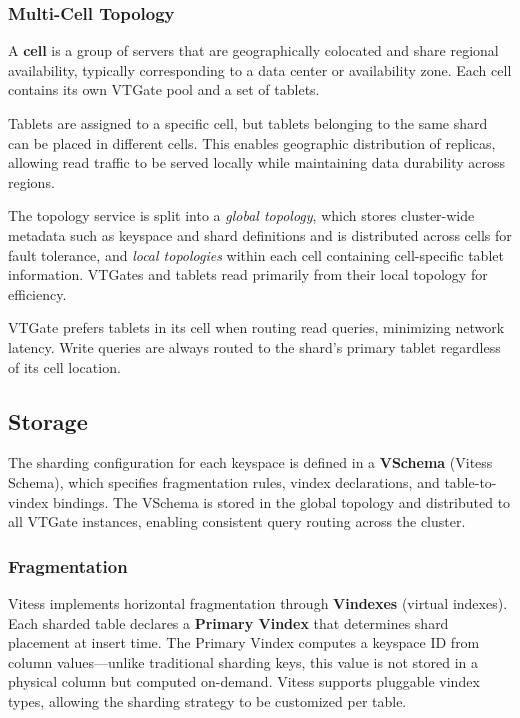 \documentclass{article}
\begin{document}
\subsubsection{Multi-Cell Topology}

A \textbf{cell} is a group of servers that are geographically colocated and share regional availability, typically corresponding to a data center or availability zone. Each cell contains its own VTGate pool and a set of tablets.

Tablets are assigned to a specific cell, but tablets belonging to the same shard can be placed in different cells. This enables geographic distribution of replicas, allowing read traffic to be served locally while maintaining data durability across regions.

The topology service is split into a \emph{global topology}, which stores cluster-wide metadata such as keyspace and shard definitions and is distributed across cells for fault tolerance, and \emph{local topologies} within each cell containing cell-specific tablet information. VTGates and tablets read primarily from their local topology for efficiency.

VTGate prefers tablets in its cell when routing read queries, minimizing network latency. Write queries are always routed to the shard's primary tablet regardless of its cell location.

\subsection{Storage}

The sharding configuration for each keyspace is defined in a \textbf{VSchema} (Vitess Schema), which specifies fragmentation rules, vindex declarations, and table-to-vindex bindings. The VSchema is stored in the global topology and distributed to all VTGate instances, enabling consistent query routing across the cluster.

\subsubsection{Fragmentation}

Vitess implements horizontal fragmentation through \textbf{Vindexes} (virtual indexes). Each sharded table declares a \textbf{Primary Vindex} that determines shard placement at insert time. The Primary Vindex computes a keyspace ID from column values---unlike traditional sharding keys, this value is not stored in a physical column but computed on-demand. Vitess supports pluggable vindex types, allowing the sharding strategy to be customized per table.
\end{document}
